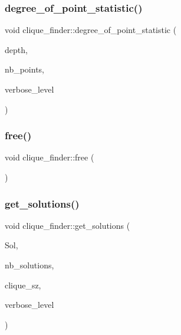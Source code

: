 \mbox{\label{classclique__finder_a163ce0ea22a12c2eaf8eca32da314a1f}} 
\subsubsection{\texorpdfstring{degree\+\_\+of\+\_\+point\+\_\+statistic()}{degree\_of\_point\_statistic()}}
{\footnotesize\ttfamily void clique\+\_\+finder\+::degree\+\_\+of\+\_\+point\+\_\+statistic (\begin{DoxyParamCaption}\item[{\mbox{\hyperlink{galois_8h_a09fddde158a3a20bd2dcadb609de11dc}{I\+NT}}}]{depth,  }\item[{\mbox{\hyperlink{galois_8h_a09fddde158a3a20bd2dcadb609de11dc}{I\+NT}}}]{nb\+\_\+points,  }\item[{\mbox{\hyperlink{galois_8h_a09fddde158a3a20bd2dcadb609de11dc}{I\+NT}}}]{verbose\+\_\+level }\end{DoxyParamCaption})}

\mbox{\label{classclique__finder_ab9dbf7e2012a2047558b980a0e485569}} 
\subsubsection{\texorpdfstring{free()}{free()}}
{\footnotesize\ttfamily void clique\+\_\+finder\+::free (\begin{DoxyParamCaption}{ }\end{DoxyParamCaption})}

\mbox{\label{classclique__finder_aeb4911f1f17be82311374045f4a778a7}} 
\subsubsection{\texorpdfstring{get\+\_\+solutions()}{get\_solutions()}}
{\footnotesize\ttfamily void clique\+\_\+finder\+::get\+\_\+solutions (\begin{DoxyParamCaption}\item[{\mbox{\hyperlink{galois_8h_a09fddde158a3a20bd2dcadb609de11dc}{I\+NT}} $\ast$\&}]{Sol,  }\item[{\mbox{\hyperlink{galois_8h_a09fddde158a3a20bd2dcadb609de11dc}{I\+NT}} \&}]{nb\+\_\+solutions,  }\item[{\mbox{\hyperlink{galois_8h_a09fddde158a3a20bd2dcadb609de11dc}{I\+NT}} \&}]{clique\+\_\+sz,  }\item[{\mbox{\hyperlink{galois_8h_a09fddde158a3a20bd2dcadb609de11dc}{I\+NT}}}]{verbose\+\_\+level }\end{DoxyParamCaption})}

